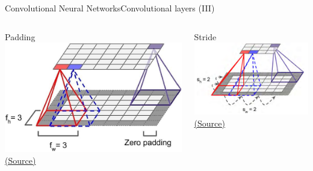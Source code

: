 \documentclass[10pt,compress]{beamer} %
\begin{document}
\begin{frame}{Convolutional Neural Networks}{Convolutional layers (III)}

    \begin{columns}
	    \centering Padding\\
        \bigskip
	    \includegraphics[width=\textwidth]{figs/padding.png}\\
    	\scriptsize\href{https://www.oreilly.com/library/view/hands-on-machine-learning/9781492032632/}{(Source)}

        \centering Stride\\
        \bigskip
	    \includegraphics[width=\textwidth]{figs/stride.png}\\
	    \scriptsize\href{https://www.oreilly.com/library/view/hands-on-machine-learning/9781492032632/}{(Source)}
    \end{columns}
\end{frame}
\end{document}
